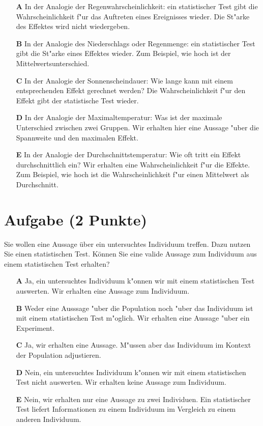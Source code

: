 \documentclass[a4paper, 9pt]{scrartcl}\usepackage[]{graphicx}\usepackage[]{xcolor}
\begin{document}
\begin{enumerate}
\item [\textbf{A} \msquare] In der Analogie der Regenwahrscheinlichkeit: ein statistischer Test gibt die Wahrscheinlichkeit f{"u}r das Auftreten eines Ereignisses wieder. Die St{"a}rke des Effektes wird nicht wiedergeben.
\item [\textbf{B} \msquare] In der Analogie des Niederschlags oder Regenmenge: ein statistischer Test gibt die St{"a}rke eines Effektes wieder. Zum Beispiel, wie hoch ist der Mittelwertsunterschied.
\item [\textbf{C} \msquare] In der Analogie der Sonnenscheindauer: Wie lange kann mit einem entsprechenden Effekt gerechnet werden? Die Wahrscheinlichkeit f{"u}r den Effekt gibt der statistische Test wieder.
\item [\textbf{D} \msquare] In der Analogie der Maximaltemperatur: Was ist der maximale Unterschied zwischen zwei Gruppen. Wir erhalten hier eine Aussage {"u}ber die Spannweite und den maximalen Effekt.
\item [\textbf{E} \msquare] In der Analogie der Durchschnittstemperatur: Wie oft tritt ein Effekt durchschnittlich ein? Wir erhalten eine Wahrscheinlichkeit f{"u}r die Effekte. Zum Beispiel, wie hoch ist die Wahrscheinlichkeit f{"u}r einen Mittelwert als Durchschnitt.
\end{enumerate}

\section{Aufgabe \hfill (2 Punkte)}



Sie wollen eine Aussage {\"u}ber ein untersuchtes Individuum treffen. Dazu nutzen Sie einen
statistischen Test. K{\"o}nnen Sie eine valide Aussage zum Individuum
aus einem statistischen Test erhalten? 



\begin{enumerate}
\item [\textbf{A} \msquare] Ja, ein untersuchtes Individuum k{"o}nnen wir mit einem statistischen Test auswerten. Wir erhalten eine Aussage zum Individuum.
\item [\textbf{B} \msquare] Weder eine Ausssage {"u}ber die Population noch {"u}ber das Individuum ist mit einem statistischen Test m{"o}glich. Wir erhalten eine Aussage {"u}ber ein Experiment.
\item [\textbf{C} \msquare] Ja, wir erhalten eine Aussage. M{"u}ssen aber das Individuum im Kontext der Population adjustieren.
\item [\textbf{D} \msquare] Nein, ein untersuchtes Individuum k{"o}nnen wir mit einem statistischen Test nicht auswerten. Wir erhalten keine Aussage zum Individuum.
\item [\textbf{E} \msquare] Nein, wir erhalten nur eine Aussage zu zwei Individuen. Ein statistischer Test liefert Informationen zu einem Individuum im Vergleich zu einem anderen Individuum.
\end{enumerate}
\end{document}
